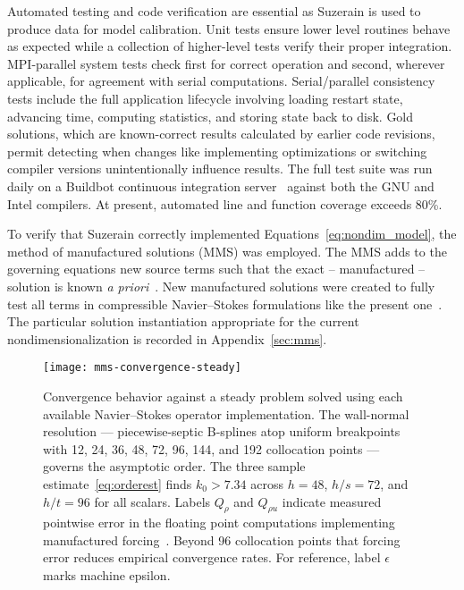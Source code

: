 Automated testing and code verification are essential as Suzerain is used to
produce data for model calibration.  Unit tests ensure lower level
routines behave as expected while a collection of higher-level tests verify
their proper integration.  MPI-parallel system tests check first for correct operation
and second, wherever applicable, for agreement with serial computations.
Serial/parallel consistency tests include the full application lifecycle
involving loading restart state, advancing time, computing statistics, and
storing state back to disk.  Gold solutions, which are known-correct results
calculated by earlier code revisions, permit detecting when changes
like implementing optimizations or switching compiler versions
unintentionally influence results.
The full test suite
was run daily on a Buildbot continuous integration server~\citep{Buildbot}
against both the GNU and Intel\textsuperscript{\textregistered} compilers.  At present, automated line and function coverage
exceeds 80\%.


To verify that Suzerain correctly implemented Equations~\eqref{eq:nondim_model}, the method of manufactured solutions (MMS)
was employed.  The MMS adds to the governing equations new source
terms such that the exact -- manufactured -- solution is known \textit{a
priori}~\citep{Roache1984Symbolic, Steinberg1985Symbolic, MASA}.  New
manufactured solutions were created to fully test all terms in compressible
Navier--Stokes formulations like the present one~\citep{Ulerich2012MMS}.  The
particular solution instantiation appropriate for the current
nondimensionalization is recorded in Appendix~\ref{sec:mms}.

\begin{figure}[t]
\centering
\texttt{[image: mms-convergence-steady]}
\caption[Verification of Suzerain against a steady manufactured solution]{%
  Convergence behavior against a steady problem solved using each available
  Navier--Stokes operator implementation.  The wall-normal resolution ---
  piecewise-septic B-splines atop uniform breakpoints with 12, 24, 36, 48, 72,
  96, 144, and 192 collocation points --- governs the asymptotic order.  The
  three sample estimate~\eqref{eq:orderest} finds $k_0>7.34$ across $h=48$,
  $h/s=72$, and $h/t=96$ for all scalars.  Labels $Q_\rho$ and $Q_{\rho{}u}$
  indicate measured pointwise error in the floating point computations
  implementing manufactured forcing~\citep{Ulerich2012MMS}.  Beyond 96
  collocation points that forcing error reduces empirical convergence rates.
  For reference, label $\epsilon$ marks machine
  epsilon.\label{fig:convergence-steady}
}
%
\end{figure}

